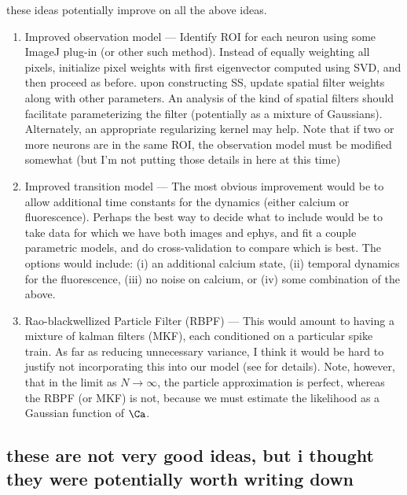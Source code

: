 these ideas potentially improve on all the above ideas.

\begin{enumerate}
\item Improved observation model --- Identify ROI for each neuron using some ImageJ plug-in (or other such method).  Instead of equally weighting all pixels, initialize pixel weights with first eigenvector computed using SVD, and then proceed as before.  upon constructing SS, update spatial filter weights along with other parameters.  An analysis of the kind of spatial filters should facilitate parameterizing the filter (potentially as a mixture of Gaussians).  Alternately, an appropriate regularizing kernel may help. Note that if two or more neurons are in the same ROI, the observation model must be modified somewhat (but I'm not putting those details in here at this time) 
\item Improved transition model --- The most obvious improvement would be to allow additional time constants for the dynamics (either calcium or fluorescence).  Perhaps the best way to decide what to include would be to take data for which we have both images and ephys, and fit a couple parametric models, and do cross-validation to compare which is best.  The options would include: (i) an additional calcium state, (ii) temporal dynamics for the fluorescence, (iii) no noise on calcium, or (iv) some combination of the above.  
\item Rao-blackwellized Particle Filter (RBPF) --- This would amount to having a mixture of kalman filters (MKF), each conditioned on a particular spike train.  As far as reducing unnecessary variance, I think it would be hard to justify not incorporating this into our model (see \cite{Chen00} for details). Note, however, that in the limit as $N \rightarrow \infty$, the particle approximation is perfect, whereas the RBPF (or MKF) is not, because we must estimate the likelihood as a Gaussian function of $\Ca$.  
\end{enumerate}

\subsection{these are not very good ideas, but i thought they were potentially worth writing down}

